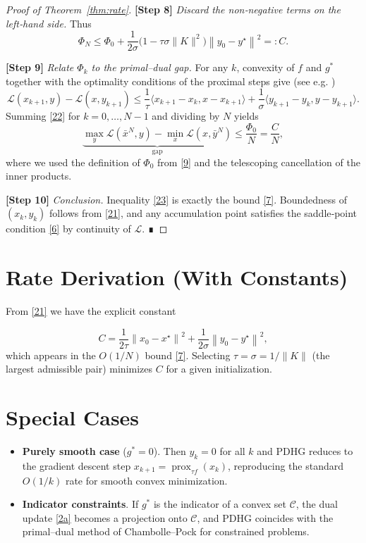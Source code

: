 \documentclass{article}
\newcommand{\prox}{\operatorname{prox}}
\newcommand{\ip}[2]{\langle #1,#2\rangle}
\newcommand{\norm}[1]{\left\|#1\right\|}
\begin{document}
\begin{proof}[Proof of Theorem~\ref{thm:rate}]
\noindent\textbf{[Step 8]}  \textit{Discard the non‑negative terms on the left‑hand side.}  
Thus
\[
\Phi_{N}\le \Phi_{0}
          +\frac{1}{2\sigma}\bigl(1-\tau\sigma\|K\|^{2}\bigr)
            \norm{y_{0}-y^{\star}}^{2}
=:C.
\tag{21}
\]

\noindent\textbf{[Step 9]}  \textit{Relate $\Phi_{k}$ to the primal–dual gap.}  
For any $k$, convexity of $f$ and $g^{*}$ together with the optimality conditions of the proximal steps give (see e.g. \cite{Chambolle2011})
\[
\mathcal L(x_{k+1},y)-\mathcal L(x,y_{k+1})
\le
\frac{1}{\tau}\ip{x_{k+1}-x_{k}}{x-x_{k+1}}
+\frac{1}{\sigma}\ip{y_{k+1}-y_{k}}{y-y_{k+1}}.
\tag{22}
\]
Summing \eqref{22} for $k=0,\dots,N-1$ and dividing by $N$ yields
\[
\underbrace{\max_{y}\mathcal L(\bar x^{N},y)-\min_{x}\mathcal L(x,\bar y^{N})}_{\text{gap}}
\le\frac{\Phi_{0}}{N}
   =\frac{C}{N},
\tag{23}
\]
where we used the definition of $\Phi_{0}$ from \eqref{9} and the telescoping cancellation of the inner products.

\noindent\textbf{[Step 10]}  \textit{Conclusion.}  
Inequality \eqref{23} is exactly the bound \eqref{7}. Boundedness of $(x_{k},y_{k})$ follows from \eqref{21}, and any accumulation point satisfies the saddle‑point condition \eqref{6} by continuity of $\mathcal L$. ∎
\end{proof}

\section*{Rate Derivation (With Constants)}
From \eqref{21} we have the explicit constant  

\[
C=\frac{1}{2\tau}\norm{x_{0}-x^{\star}}^{2}
   +\frac{1}{2\sigma}\norm{y_{0}-y^{\star}}^{2},
\tag{24}
\]
which appears in the $O(1/N)$ bound \eqref{7}. Selecting $\tau=\sigma=1/\|K\|$ (the largest admissible pair) minimizes $C$ for a given initialization.

\section*{Special Cases}
\begin{itemize}
\item \textbf{Purely smooth case} ($g^{*}=0$). Then $y_{k}=0$ for all $k$ and PDHG reduces to the gradient descent step $x_{k+1}= \prox_{\tau f}(x_{k})$, reproducing the standard $O(1/k)$ rate for smooth convex minimization.
\item \textbf{Indicator constraints}. If $g^{*}$ is the indicator of a convex set $\mathcal C$, the dual update \eqref{2a} becomes a projection onto $\mathcal C$, and PDHG coincides with the primal–dual method of Chambolle–Pock for constrained problems.
\end{itemize}
\end{document}
